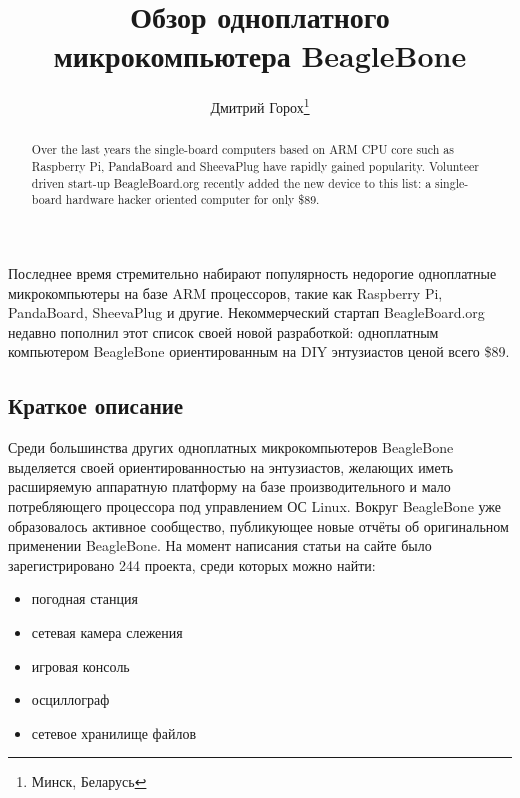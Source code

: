 \documentclass[10pt, a5paper]{article}
\begin{document}
\title{Обзор одноплатного микрокомпьютера BeagleBone}%

\author{Дмитрий Горох\footnote{Минск, Беларусь}}
\maketitle

\begin{abstract}
Over the last years the single-board computers based on ARM CPU core such as Raspberry Pi, PandaBoard and SheevaPlug have rapidly gained popularity. Volunteer driven start-up \linebreak BeagleBoard.org recently added the new device to this list: a single-board hardware hacker oriented computer for only \$89.
\end{abstract}

Последнее время стремительно набирают популярность недорогие одноплатные микрокомпьютеры на базе ARM процессоров, такие как Raspberry Pi, PandaBoard, SheevaPlug и другие. Некоммерческий стартап BeagleBoard.org недавно пополнил этот список своей новой разработкой: одноплатным компьютером BeagleBone ориентированным на DIY энтузиастов ценой всего \$89.

\subsection*{Краткое описание}



Среди большинства других одноплатных микрокомпьютеров \linebreak BeagleBone выделяется своей ориентированностью на энтузиастов, желающих иметь расширяемую аппаратную платформу на базе производительного и мало потребляющего процессора под управлением ОС Linux. Вокруг BeagleBone уже образовалось активное сообщество, публикующее новые отчёты об оригинальном применении BeagleBone. На момент написания статьи на сайте было зарегистрировано 244 проекта, среди которых можно найти:

\begin{itemize}
  \item погодная станция
  \item сетевая камера слежения
  \item игровая консоль
  \item осциллограф
  \item сетевое хранилище файлов
\end{itemize}
\end{document}
